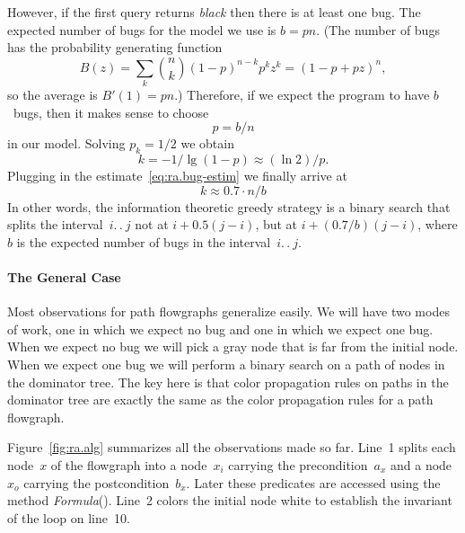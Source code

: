 \documentclass[a4paper]{article}
\theoremstyle{slanted}
\theoremstyle{definition}
\theoremstyle{remark}
\begin{document}
However, if the first query returns \textit{black} then there is
at least one bug. The expected number of bugs for the model we
use is $b=pn$. (The number of bugs has the probability generating
function
\begin{equation}
B(z)=\sum_k \binom{n}{k} (1-p)^{n-k} p^k z^k = (1-p+pz)^n,
\end{equation}
so the average is $B'(1)=pn$.) Therefore, if we expect the
program to have $b$~bugs, then it makes sense to choose
\begin{equation}
p=b/n \label{eq:ra.bug-estim}
\end{equation}
in our model. Solving $p_k=1/2$ we obtain
\begin{equation}
k=-1/\lg(1-p)\approx(\ln2)/p.
\end{equation}
Plugging in the estimate~\eqref{eq:ra.bug-estim} we finally
arrive at
\begin{equation}
k\approx 0.7\cdot n/b
\end{equation}
In other words, the information theoretic greedy strategy is
a binary search that splits the interval~$i.\,.\>j$ not at
$i+0.5(j-i)$, but at $i+(0.7/b)(j-i)$, where $b$ is the expected
number of bugs in the interval~$i.\,.\>j$.

\paragraph{The General Case}

Most observations for path flowgraphs generalize easily. We will
have two modes of work, one in which we expect no bug and one in
which we expect one bug. When we expect no bug we will pick a
gray node that is far from the initial node. When we expect one
bug we will perform a binary search on a path of nodes in the
dominator tree. The key here is that color propagation rules on
paths in the dominator tree are exactly the same as the color
propagation rules for a path flowgraph.

Figure~\ref{fig:ra.alg} summarizes all the observations made
so far. Line~1 splits each node~$x$ of the flowgraph into a
node~$x_i$ carrying the precondition~$a_x$ and a node~$x_o$
carrying the postcondition~$b_x$. Later these predicates are
accessed using the method \textit{Formula}(). Line~2 colors the
initial node white to establish the invariant of the loop on
line~10.
\end{document}
